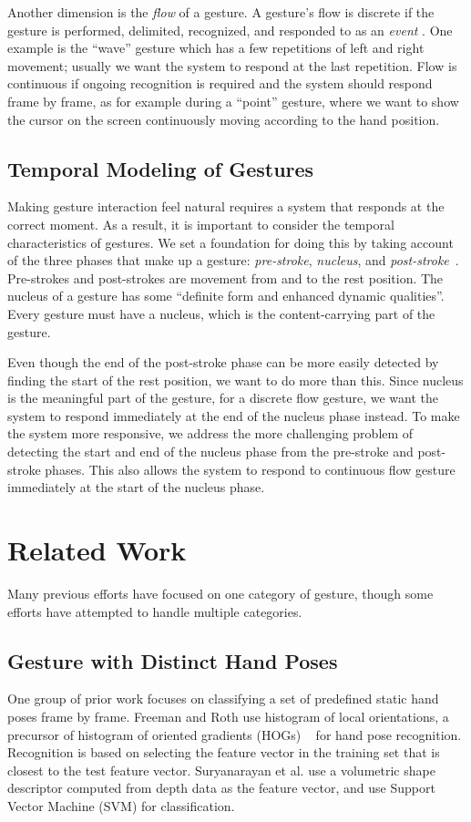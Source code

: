 \documentclass[conference]{IEEEtran}
\begin{document}
Another dimension is the \textit{flow} of a gesture. A gesture's flow is
discrete if the gesture is performed, delimited, recognized, and responded to
as an \textit{event} \cite{wobbrock09}. One example is the ``wave'' gesture
which has a few repetitions of left and right movement; usually we want the system to
respond at the last repetition. Flow is continuous if ongoing recognition is required
and the system should respond frame by frame, as for example during a
``point'' gesture, where we want to show the cursor on the screen
continuously moving according to the hand position. 

\subsection{Temporal Modeling of Gestures}
Making gesture interaction feel natural requires a system that responds at the
correct moment. As a result, it is important to consider the temporal
characteristics of gestures. We set a foundation for doing this by taking
account of the three phases that make up a gesture: \textit{pre-stroke},
\textit{nucleus}, and \textit{post-stroke}~\cite{Pavlovic97}.
Pre-strokes and post-strokes are movement from and to the
rest position. The nucleus of a gesture
has some ``definite form and enhanced dynamic
qualities''\cite{kendon86}. Every gesture must have a nucleus, which is the content-carrying
part of the gesture. 

Even though the end of the
post-stroke phase can be more easily detected by finding the start of the
rest position, we want to do more than this. Since nucleus is the meaningful
part of the gesture, for a discrete flow gesture, we want the system to respond immediately at the end of the nucleus
phase instead. To make the system more responsive,
we address the more challenging problem of detecting the start and end of the nucleus phase from the pre-stroke
and post-stroke phases. This also allows the system to respond to continuous
flow gesture immediately at the start of the nucleus phase.

\section{Related Work}\label{sec:related}
Many previous efforts have focused on one category of
gesture, though some efforts have attempted to handle multiple categories.

\subsection{Gesture with Distinct Hand Poses}
One group of prior work focuses on classifying a set of predefined static hand
poses frame by frame. Freeman and Roth \cite{freeman95} use histogram of local
orientations, a precursor of histogram of oriented gradients (HOGs)
~\cite{dalal05}
for hand pose recognition.
Recognition is based on selecting the feature vector in the training set that is closest to the test feature vector. Suryanarayan et al. \cite{suryanarayan2010} use a volumetric shape
descriptor computed from depth data as the feature vector, and use Support
Vector Machine (SVM) for classification.
\end{document}
